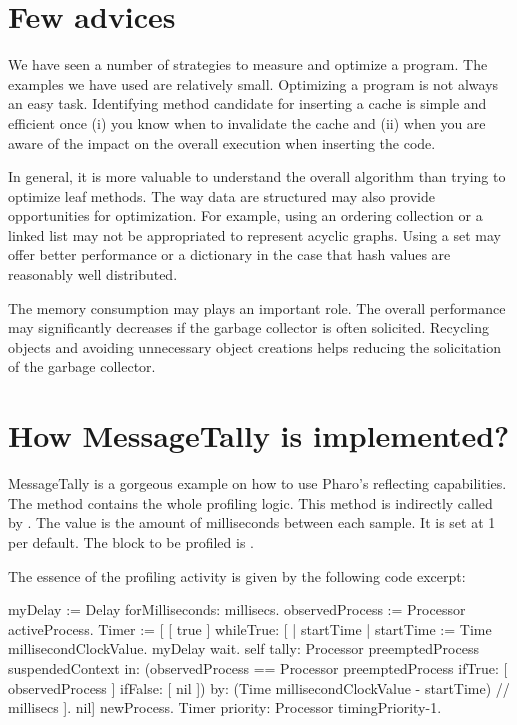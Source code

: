 \documentclass[a4paper,10pt,twoside]{book}
\begin{document}
\section{Few advices}

We have seen a number of strategies to measure and optimize a program. The examples we have used are relatively small. Optimizing a program is not always an easy task. Identifying method candidate for inserting a cache is simple and efficient once (i) you know when to invalidate the cache and (ii) when you are aware of the impact on the overall execution when inserting the code.

In general, it is more valuable to understand the overall algorithm than trying to optimize leaf methods. The way data are structured may also provide opportunities for optimization. For example, using an ordering collection or a linked list may not be appropriated to represent acyclic graphs. Using a set may offer better performance or a dictionary in the case that hash values are reasonably well distributed.

The memory consumption may plays an important role. The overall performance may significantly decreases if the garbage collector is often solicited. Recycling objects and avoiding unnecessary object creations helps reducing the solicitation of the garbage collector.

\section {How MessageTally is implemented?}

MessageTally is a gorgeous example on how to use Pharo's reflecting capabilities. The method  contains the whole profiling logic. This method is indirectly called by . The  value is the amount of milliseconds between each sample. It is set at 1 per default. The block to be profiled is .

The essence of the profiling activity is given by the following code excerpt:

\begin{code}
myDelay := Delay forMilliseconds: millisecs.
observedProcess := Processor activeProcess.
Timer := [
	[ true ] whileTrue: [
		| startTime |
		startTime := Time millisecondClockValue.
		myDelay wait.
		self
			tally: Processor preemptedProcess suspendedContext
			in: (observedProcess == Processor preemptedProcess 
					ifTrue: [ observedProcess ] ifFalse: [ nil ])
			by: (Time millisecondClockValue - startTime) // millisecs ].
	nil] newProcess.
Timer priority: Processor timingPriority-1.
\end{code}
\end{document}
